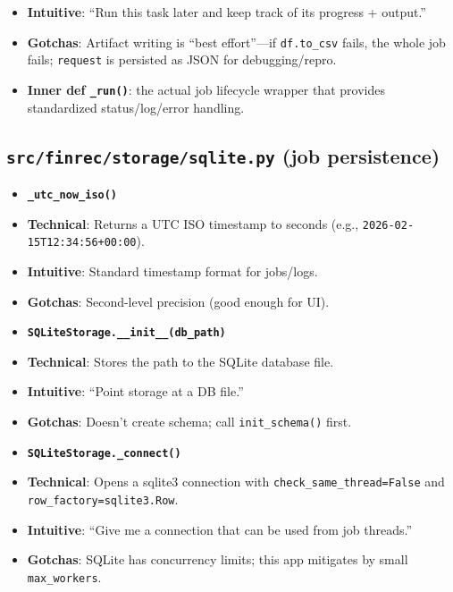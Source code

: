 \documentclass[11pt]{article}
\begin{document}
\begin{itemize}[leftmargin=*,nosep]
\item \textbf{Intuitive}: “Run this task later and keep track of its progress + output.”
\item \textbf{Gotchas}: Artifact writing is “best effort”—if \texttt{df.to\_csv} fails, the whole job fails; \texttt{request} is persisted as JSON for debugging/repro.
\item \textbf{Inner def \texttt{\_run()}}: the actual job lifecycle wrapper that provides standardized status/log/error handling.
\end{itemize}



\subsection{\texttt{src/finrec/storage/sqlite.py} (job persistence)}


\begin{itemize}[leftmargin=*,nosep]
\item \textbf{\texttt{\_utc\_now\_iso()}}
\item \textbf{Technical}: Returns a UTC ISO timestamp to seconds (e.g., \texttt{2026-02-15T12:34:56+00:00}).
\item \textbf{Intuitive}: Standard timestamp format for jobs/logs.
\item \textbf{Gotchas}: Second-level precision (good enough for UI).
\end{itemize}


\begin{itemize}[leftmargin=*,nosep]
\item \textbf{\texttt{SQLiteStorage.\_\_init\_\_(db\_path)}}
\item \textbf{Technical}: Stores the path to the SQLite database file.
\item \textbf{Intuitive}: “Point storage at a DB file.”
\item \textbf{Gotchas}: Doesn’t create schema; call \texttt{init\_schema()} first.
\end{itemize}


\begin{itemize}[leftmargin=*,nosep]
\item \textbf{\texttt{SQLiteStorage.\_connect()}}
\item \textbf{Technical}: Opens a sqlite3 connection with \texttt{check\_same\_thread=False} and \texttt{row\_factory=sqlite3.Row}.
\item \textbf{Intuitive}: “Give me a connection that can be used from job threads.”
\item \textbf{Gotchas}: SQLite has concurrency limits; this app mitigates by small \texttt{max\_workers}.
\end{itemize}
\end{document}
